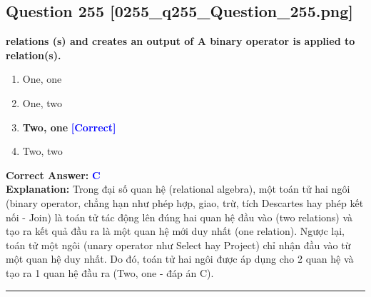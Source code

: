 \documentclass[11pt,a4paper]{article}
\begin{document}
\begin{minipage}{\textwidth}
\subsection*{Question 255 \quad \footnotesize{[0255\_q255\_Question\_255.png]}}
\noindent \textbf{relations (s) and creates an output of A binary operator is applied to relation(s).}

\begin{enumerate}[label=\Alph*.]
    \item One, one
    \item One, two
    \item \textbf{Two, one} \hfill \textcolor{blue}{\textbf{[Correct]}}
    \item Two, two
\end{enumerate}

\noindent \textbf{Correct Answer:} \textcolor{blue}{\textbf{C}} \\[2pt]
\noindent \textbf{Explanation:} Trong đại số quan hệ (relational algebra), một toán tử hai ngôi (binary operator, chẳng hạn như phép hợp, giao, trừ, tích Descartes hay phép kết nối - Join) là toán tử tác động lên đúng hai quan hệ đầu vào (two relations) và tạo ra kết quả đầu ra là một quan hệ mới duy nhất (one relation). Ngược lại, toán tử một ngôi (unary operator như Select hay Project) chỉ nhận đầu vào từ một quan hệ duy nhất. Do đó, toán tử hai ngôi được áp dụng cho 2 quan hệ và tạo ra 1 quan hệ đầu ra (Two, one - đáp án C).

\par\vspace{0.3cm}
\hrule
\vspace{0.3cm}
\end{minipage}
\end{document}
